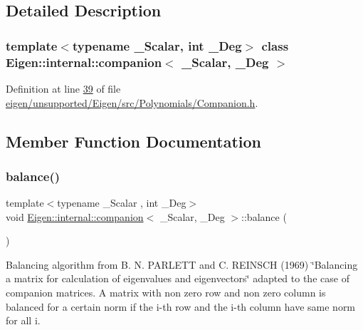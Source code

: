 \subsection{Detailed Description}
\subsubsection*{template$<$typename \+\_\+\+Scalar, int \+\_\+\+Deg$>$\newline
class Eigen\+::internal\+::companion$<$ \+\_\+\+Scalar, \+\_\+\+Deg $>$}



Definition at line \hyperlink{eigen_2unsupported_2_eigen_2src_2_polynomials_2_companion_8h_source_l00039}{39} of file \hyperlink{eigen_2unsupported_2_eigen_2src_2_polynomials_2_companion_8h_source}{eigen/unsupported/\+Eigen/src/\+Polynomials/\+Companion.\+h}.



\subsection{Member Function Documentation}
\mbox{\label{class_eigen_1_1internal_1_1companion_a7362d054f04f6d554fb6c8a279287000}} 
\subsubsection{\texorpdfstring{balance()}{balance()}\hspace{0.1cm}{\footnotesize\ttfamily [1/2]}}
{\footnotesize\ttfamily template$<$typename \+\_\+\+Scalar , int \+\_\+\+Deg$>$ \\
void \hyperlink{class_eigen_1_1internal_1_1companion}{Eigen\+::internal\+::companion}$<$ \+\_\+\+Scalar, \+\_\+\+Deg $>$\+::balance (\begin{DoxyParamCaption}{ }\end{DoxyParamCaption})}

Balancing algorithm from B. N. P\+A\+R\+L\+E\+TT and C. R\+E\+I\+N\+S\+CH (1969) \char`\"{}\+Balancing a matrix for calculation of eigenvalues and eigenvectors\char`\"{} adapted to the case of companion matrices. A matrix with non zero row and non zero column is balanced for a certain norm if the i-\/th row and the i-\/th column have same norm for all i. 


